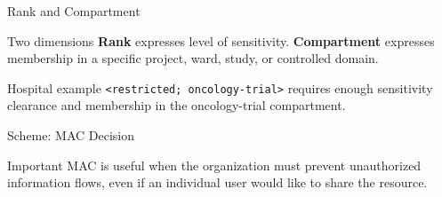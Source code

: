 \documentclass[presentation]{beamer}
\begin{document}
\begin{frame}[c]{Rank and Compartment}
\begin{block}{Two dimensions}
\textbf{Rank} expresses level of sensitivity. \textbf{Compartment} expresses membership in a
specific project, ward, study, or controlled domain.
\end{block}

\begin{exampleblock}{Hospital example}
\texttt{<restricted; oncology-trial>} requires enough sensitivity clearance and membership in the
oncology-trial compartment.
\end{exampleblock}
\end{frame}

\begin{frame}[c]{Scheme: MAC Decision}
\begin{center}
\end{center}

\begin{block}{Important}
MAC is useful when the organization must prevent unauthorized information flows, even if an
individual user would like to share the resource.
\end{block}
\end{frame}
\end{document}

